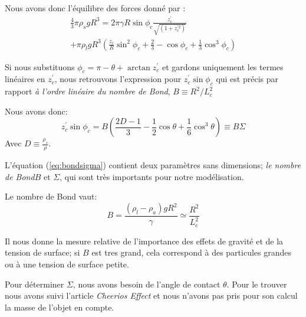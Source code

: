         Nous avons donc l'équilibre des forces donné par :
        \begin{multline}
            \frac{4}{3}\pi\rho_{s}gR^3 =2\pi\gamma R \sin\phi_c \frac{z_c^{'}}{\sqrt{(1+z_c^{'2})}} 
            \\+ \pi\rho_l g R^3 \left(\frac{z_c}{R}\sin^2 \phi_c + \frac{2}{3}-\cos\phi_c+\frac{1}{3}\cos^3 \phi_c\right)
            \label{eq:BalanceOfForces}
        \end{multline}


        Si nous substituons \(\phi_c = \pi - \theta + \arctan z_c^{'}\) et gardons uniquement les termes linéaires en \(z_c^{'}\), nous retrouvons l'expression pour \(z_c^{'}\sin \phi_c\) qui est précis par rapport \textit{à l'ordre linéaire du nombre de Bond}, \(B \equiv R^2/L_c^2\) 

        Nous avons donc:
        \begin{equation}
            z_c^{'}\sin \phi_c = B\left(\frac{2D-1}{3}-\frac{1}{2}\cos \theta + \frac{1}{6} \cos^3 \theta\right) \equiv B\Sigma
            \label{eq:bondsigma}
        \end{equation}
        Avec \(D \equiv \frac{\rho_s}{\rho}\).


        L'équation (\ref{eq:bondsigma}) contient deux paramètres sans dimensions; \textit{le nombre de Bond}$B$ et $\Sigma$, qui sont très importants pour notre modélisation.

        Le nombre de Bond vaut:
        \begin{equation}
            B = \frac{(\rho_l-\rho_{a})gR^2}{\gamma} \simeq \frac{R^2}{L_c^2}
        \end{equation}

        Il nous donne la mesure relative de l'importance des effets de gravité et de la tension de surface; si $B$ est tres grand, cela correspond à des particules grandes ou à une tension de surface petite. 

        Pour déterminer $\Sigma$, nous avons besoin de l'angle de contact $\theta$. Pour le trouver nous avons suivi l'article \textit{Cheerios Effect}\cite{vella_cheerios_2005} et nous n'avons pas pris pour son calcul la masse de l'objet en compte.

